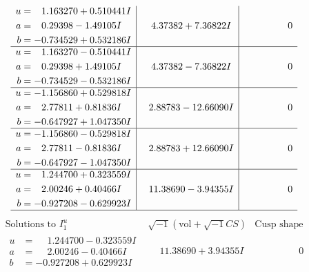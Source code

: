 \documentclass[1p]{elsarticle_modified}
\theoremstyle{definition}
\newcommand{\I}{\sqrt{-1}}
\begin{document}
$$\begin{array}{c|c|c}
\begin{aligned}
u &= \phantom{-}1.163270 + 0.510441 I \\
a &= \phantom{-}0.29398 - 1.49105 I \\
b &= -0.734529 + 0.532186 I\end{aligned}
 & \phantom{-}4.37382 + 7.36822 I & \phantom{-0.000000 } 0 \\ \hline\begin{aligned}
u &= \phantom{-}1.163270 - 0.510441 I \\
a &= \phantom{-}0.29398 + 1.49105 I \\
b &= -0.734529 - 0.532186 I\end{aligned}
 & \phantom{-}4.37382 - 7.36822 I & \phantom{-0.000000 } 0 \\ \hline\begin{aligned}
u &= -1.156860 + 0.529818 I \\
a &= \phantom{-}2.77811 + 0.81836 I \\
b &= -0.647927 + 1.047350 I\end{aligned}
 & \phantom{-}2.88783 - 12.66090 I & \phantom{-0.000000 } 0 \\ \hline\begin{aligned}
u &= -1.156860 - 0.529818 I \\
a &= \phantom{-}2.77811 - 0.81836 I \\
b &= -0.647927 - 1.047350 I\end{aligned}
 & \phantom{-}2.88783 + 12.66090 I & \phantom{-0.000000 } 0 \\ \hline\begin{aligned}
u &= \phantom{-}1.244700 + 0.323559 I \\
a &= \phantom{-}2.00246 + 0.40466 I \\
b &= -0.927208 - 0.629923 I\end{aligned}
 & \phantom{-}11.38690 - 3.94355 I & \phantom{-0.000000 } 0\\
 \hline 
 \end{array}$$\newpage$$\begin{array}{c|c|c}  
\text{Solutions to }I^u_{1}& \I (\text{vol} + \sqrt{-1}CS) & \text{Cusp shape}\\
 \hline 
\begin{aligned}
u &= \phantom{-}1.244700 - 0.323559 I \\
a &= \phantom{-}2.00246 - 0.40466 I \\
b &= -0.927208 + 0.629923 I\end{aligned}
 & \phantom{-}11.38690 + 3.94355 I & \phantom{-0.000000 } 0 \\ \hline\begin{aligned}

\end{aligned}
\end{array}$$
\end{document}
